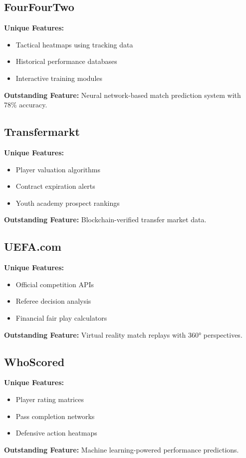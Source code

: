 \documentclass{report}
\begin{document}
\subsection{FourFourTwo}
\textbf{Unique Features:}
\begin{itemize}
    \item Tactical heatmaps using tracking data
    \item Historical performance databases
    \item Interactive training modules
\end{itemize}
\textbf{Outstanding Feature:} Neural network-based match prediction system with 78\% accuracy\citep{442}.

\subsection{Transfermarkt}
\textbf{Unique Features:}
\begin{itemize}
    \item Player valuation algorithms
    \item Contract expiration alerts
    \item Youth academy prospect rankings
\end{itemize}
\textbf{Outstanding Feature:} Blockchain-verified transfer market data\citep{transfermarkt}.

\subsection{UEFA.com}
\textbf{Unique Features:}
\begin{itemize}
    \item Official competition APIs
    \item Referee decision analysis
    \item Financial fair play calculators
\end{itemize}
\textbf{Outstanding Feature:} Virtual reality match replays with 360° perspectives\citep{uefa}.

\subsection{WhoScored}
\textbf{Unique Features:}
\begin{itemize}
    \item Player rating matrices
    \item Pass completion networks
    \item Defensive action heatmaps
\end{itemize}
\textbf{Outstanding Feature:} Machine learning-powered performance predictions\citep{whoscored}.
\end{document}
